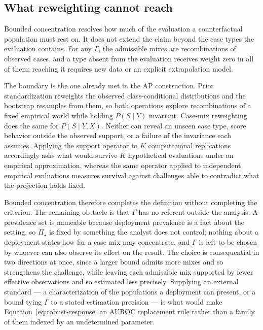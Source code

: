 \documentclass[11pt]{article}
\newcommand{\PSet}{\Pi_\star}
\theoremstyle{remark}
\begin{document}
\subsection{What reweighting cannot reach}

Bounded concentration resolves how much of the evaluation a counterfactual
population must rest on. It does not extend the claim beyond the case types the
evaluation contains. For any $\Gamma$, the admissible mixes are recombinations
of observed cases, and a type absent from the evaluation receives weight zero in
all of them; reaching it requires new data or an explicit extrapolation model.

The boundary is the one already met in the AP construction. Prior
standardization reweights the observed class-conditional distributions and the
bootstrap resamples from them, so both operations explore recombinations of a
fixed empirical world while holding $P(S\mid Y)$ invariant. Case-mix
reweighting does the same for $P(S\mid Y,X)$. Neither can reveal an unseen case
type, score behavior outside the observed support, or a failure of the
invariance each assumes. Applying the support operator to $K$ computational
replications accordingly asks what would survive $K$ hypothetical evaluations
under an empirical approximation, whereas the same operator applied to
independent empirical evaluations measures survival against challenges able to
contradict what the projection holds fixed.

Bounded concentration therefore completes the definition without completing the
criterion. The remaining obstacle is that $\Gamma$ has no referent outside the
analysis. A prevalence set is nameable because deployment prevalence is a fact
about the setting, so $\PSet$ is fixed by something the analyst does not
control; nothing about a deployment states how far a case mix may concentrate,
and $\Gamma$ is left to be chosen by whoever can also observe its effect on the
result. The choice is consequential in two directions at once, since a larger
bound admits more mixes and so strengthens the challenge, while leaving each
admissible mix supported by fewer effective observations and so estimated less
precisely. Supplying an external standard — a characterization of the
populations a deployment can present, or a bound tying $\Gamma$ to a stated
estimation precision — is what would make Equation~\eqref{eq:robust-response}
an AUROC replacement rule rather than a family of them indexed by an
undetermined parameter.
\end{document}
